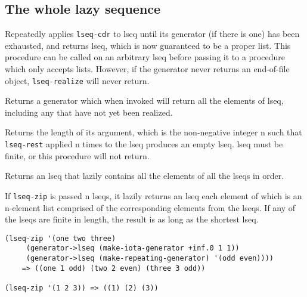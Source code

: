 \subsection{{The whole lazy sequence}}\label{the-whole-lazy-sequence}

\begin{entry}{%
  }

  Repeatedly applies
  \texttt{lseq-cdr} to lseq until its generator (if there is one) has
  been exhausted, and returns lseq, which is now guaranteed to be a
  proper list. This procedure can be called on an arbitrary lseq
  before passing it to a procedure which only accepts lists. However,
  if the generator never returns an end-of-file object,
  \texttt{lseq-realize} will never return.
\end{entry}

\begin{entry}{%
  }

  Returns a generator which when invoked will return all the elements
  of lseq, including any that have not yet been realized.
\end{entry}

\begin{entry}{%
  }

  Returns the length of its argument, which is the non-negative
  integer n such that \texttt{lseq-rest} applied n times to the lseq
  produces an empty lseq. lseq must be finite, or this procedure will
  not return.
\end{entry}

\begin{entry}{%
  }

  Returns an lseq that
  lazily contains all the elements of all the lseqs in order.
\end{entry}



\begin{entry}{%
  }

  If \texttt{lseq-zip} is passed n lseqs, it lazily returns an lseq
  each element of which is an n-element list comprised of the
  corresponding elements from the lseqs. If any of the lseqs are
  finite in length, the result is as long as the shortest lseq.

\begin{verbatim}
(lseq-zip '(one two three) 
     (generator->lseq (make-iota-generator +inf.0 1 1))
     (generator->lseq (make-repeating-generator) '(odd even))))
    => ((one 1 odd) (two 2 even) (three 3 odd))

(lseq-zip '(1 2 3)) => ((1) (2) (3))
\end{verbatim}
\end{entry}

